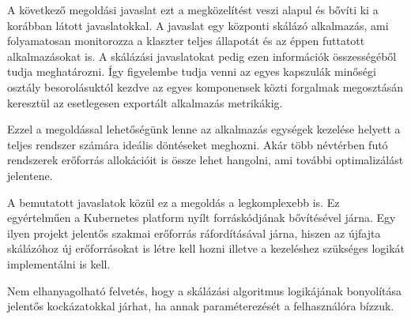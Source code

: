 A következő megoldási javaslat ezt a megközelítést veszi alapul és bővíti ki a korábban látott javaslatokkal.
A javaslat egy központi skálázó alkalmazás, ami folyamatosan monitorozza a klaszter teljes állapotát és az éppen futtatott alkalmazásokat is.
A skálázási javaslatokat pedig ezen információk összességéből tudja meghatározni.
Így figyelembe tudja venni az egyes kapszulák minőségi osztály besorolásuktól kezdve az egyes komponensek közti forgalmak megosztásán keresztül az esetlegesen exportált alkalmazás metrikákig.

Ezzel a megoldással lehetőségünk lenne az alkalmazás egységek kezelése helyett a teljes rendszer számára ideális döntéseket meghozni.
Akár több névtérben futó rendszerek erőforrás allokációit is össze lehet hangolni, ami további optimalizálást jelentene.

A bemutatott javaslatok közül ez a megoldás a legkomplexebb is. 
Ez egyértelműen a Kubernetes platform nyílt forráskódjának bővítésével járna.
Egy ilyen projekt jelentős szakmai erőforrás ráfordításával járna, hiszen az újfajta skálázóhoz új erőforrásokat is létre kell hozni illetve a kezeléshez szükséges logikát implementálni is kell.

Nem elhanyagolható felvetés, hogy a skálázási algoritmus logikájának bonyolítása jelentős kockázatokkal járhat, ha annak paraméterezését a felhasználóra bízzuk.







